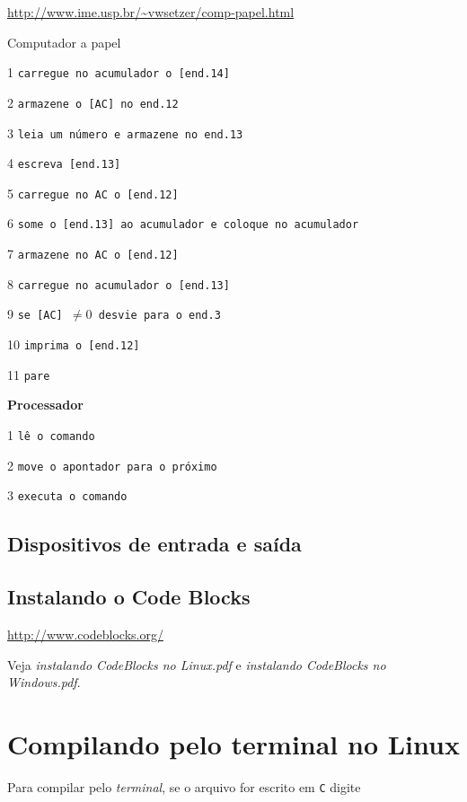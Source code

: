 \documentclass[a4paper]{memoir}
\begin{document}
\url{http://www.ime.usp.br/~vwsetzer/comp-papel.html}

\begin{ex}
Computador a papel

1 \texttt{carregue no acumulador o [end.14]}

2 \texttt{armazene o [AC] no end.12}

3 \texttt{leia um número e armazene no end.13}

4 \texttt{escreva [end.13]}

5 \texttt{carregue no AC o [end.12]}

6 \texttt{some o [end.13] ao acumulador e coloque no acumulador}

7 \texttt{armazene no AC o [end.12]}

8 \texttt{carregue no acumulador o [end.13]}

9 \texttt{se [AC] $\ne 0$ desvie para o end.3}

10 \texttt{imprima o [end.12]}

11 \texttt{pare}
\end{ex}

\textbf{Processador}

1 \texttt{lê o comando}

2 \texttt{move o apontador para o próximo}

3 \texttt{executa o comando}

\section{Dispositivos de entrada e saída}


\section{Instalando o Code Blocks}

\url{http://www.codeblocks.org/}

Veja \emph{instalando CodeBlocks no Linux.pdf} e \emph{instalando CodeBlocks no Windows.pdf}.



\chapter{Compilando pelo terminal no Linux}

Para compilar pelo \emph{terminal}, se o arquivo for escrito em \texttt{C} digite
\end{document}
